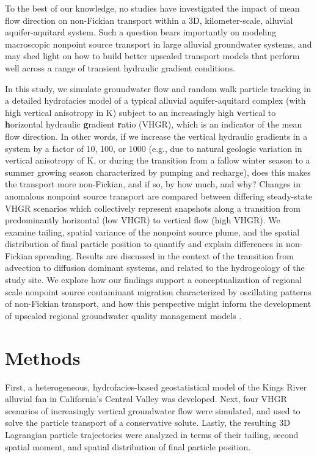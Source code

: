 To the best of our knowledge, no studies have investigated the impact of mean flow direction on non-Fickian transport within a 3D, kilometer-scale, alluvial aquifer-aquitard system. Such a question bears importantly on modeling macroscopic nonpoint source transport in large alluvial groundwater systems, and may shed light on how to build better upscaled transport models that perform well across a range of transient hydraulic gradient conditions.

In this study, we simulate groundwater flow and random walk particle tracking in a detailed hydrofacies model of a typical alluvial aquifer-aquitard complex (with high vertical anisotropy in K) subject to an increasingly high \textbf{v}ertical to \textbf{h}orizontal hydraulic \textbf{g}radient \textbf{r}atio (VHGR), which is an indicator of the mean flow direction. In other words, if we increase the vertical hydraulic gradients in a system by a factor of 10, 100, or 1000 (e.g., due to natural geologic variation in vertical anisotropy of K, or during the transition from a fallow winter season to a summer growing season characterized by pumping and recharge), does this makes the transport more non-Fickian, and if so, by how much, and why? Changes in anomalous nonpoint source transport are compared between differing steady-state VHGR scenarios which collectively represent snapshots along a transition from predominantly horizontal (low VHGR) to vertical flow (high VHGR). We examine tailing, spatial variance of the nonpoint source plume, and the spatial distribution of final particle position to quantify and explain differences in non-Fickian spreading. Results are discussed in the context of the transition from advection to diffusion dominant systems, and related to the hydrogeology of the study site. We explore how our findings support a conceptualization of regional scale nonpoint source contaminant migration characterized by oscillating patterns of non-Fickian transport, and how this perspective might inform the development of upscaled regional groundwater quality management models \citep{Fogg2006}.




\section{Methods}

First, a heterogeneous, hydrofacies-based geostatistical model of the Kings River alluvial fan in California's Central Valley was developed. Next, four VHGR scenarios of increasingly vertical groundwater flow were simulated, and used to solve the particle transport of a conservative solute. Lastly, the resulting 3D Lagrangian particle trajectories were analyzed in terms of their tailing, second spatial moment, and spatial distribution of final particle position. 

